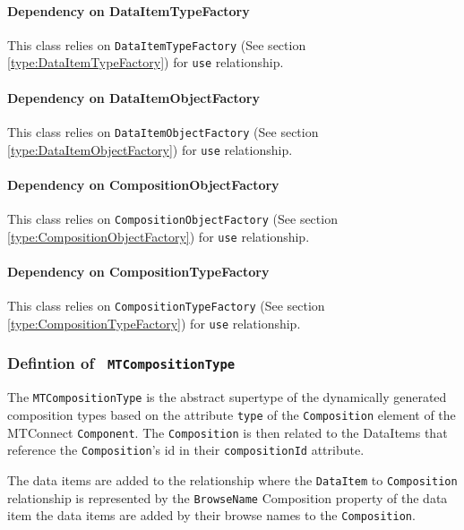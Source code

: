 \paragraph{Dependency on DataItemTypeFactory}

This class relies on \texttt{DataItemTypeFactory} (See section \ref{type:DataItemTypeFactory}) for \texttt{use} relationship.

\paragraph{Dependency on DataItemObjectFactory}

This class relies on \texttt{DataItemObjectFactory} (See section \ref{type:DataItemObjectFactory}) for \texttt{use} relationship.

\paragraph{Dependency on CompositionObjectFactory}

This class relies on \texttt{CompositionObjectFactory} (See section \ref{type:CompositionObjectFactory}) for \texttt{use} relationship.

\paragraph{Dependency on CompositionTypeFactory}

This class relies on \texttt{CompositionTypeFactory} (See section \ref{type:CompositionTypeFactory}) for \texttt{use} relationship.

\FloatBarrier
\subsubsection{Defintion of \texttt{ MTCompositionType}} \label{type:MTCompositionType}

\FloatBarrier

The \texttt{MTCompositionType} is the abstract supertype of the dynamically generated
composition types based on the attribute \texttt{type} of the \texttt{Composition} element
of the MTConnect \texttt{Component}. The \texttt{Composition} is then related to the 
DataItems that reference the \texttt{Composition}'s id in their \texttt{compositionId} 
attribute. 

The data items are added to the relationship where the \texttt{DataItem} to \texttt{Composition} 
relationship is represented by the \texttt{BrowseName} Composition property of the data item 
the data items are added by their browse names to the \texttt{Composition}.

